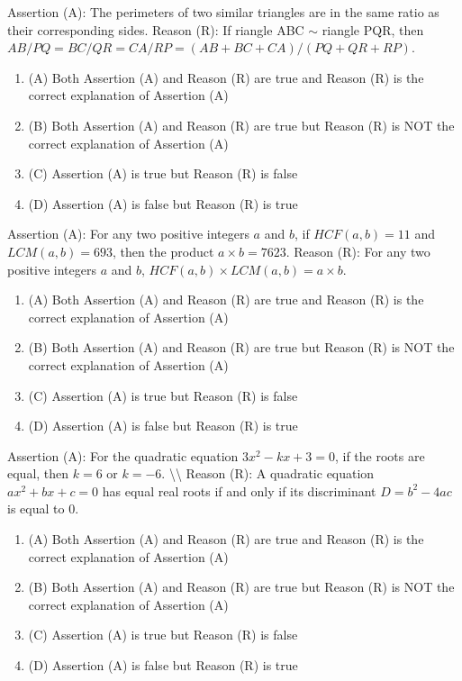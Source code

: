 \documentclass[12pt,a4paper]{exam}
\begin{document}
\begin{questions}
\question[1] Assertion (A): The perimeters of two similar triangles are in the same ratio as their corresponding sides. Reason (R): If 	riangle ABC $\sim$ 	riangle PQR, then $AB/PQ = BC/QR = CA/RP = (AB+BC+CA)/(PQ+QR+RP)$.
\begin{enumerate}[label=(\Alph*)]
  \item (A) Both Assertion (A) and Reason (R) are true and Reason (R) is the correct explanation of Assertion (A)
  \item (B) Both Assertion (A) and Reason (R) are true but Reason (R) is NOT the correct explanation of Assertion (A)
  \item (C) Assertion (A) is true but Reason (R) is false
  \item (D) Assertion (A) is false but Reason (R) is true
\end{enumerate}
\vspace{0.15cm}

\question[1] Assertion (A): For any two positive integers $a$ and $b$, if $HCF(a, b) = 11$ and $LCM(a, b) = 693$, then the product $a \times b = 7623$. Reason (R): For any two positive integers $a$ and $b$, $HCF(a, b) \times LCM(a, b) = a \times b$.
\begin{enumerate}[label=(\Alph*)]
  \item (A) Both Assertion (A) and Reason (R) are true and Reason (R) is the correct explanation of Assertion (A)
  \item (B) Both Assertion (A) and Reason (R) are true but Reason (R) is NOT the correct explanation of Assertion (A)
  \item (C) Assertion (A) is true but Reason (R) is false
  \item (D) Assertion (A) is false but Reason (R) is true
\end{enumerate}
\vspace{0.15cm}

\question[1] Assertion (A): For the quadratic equation $3x^2 - kx + 3 = 0$, if the roots are equal, then $k = 6$ or $k = -6$. \textbackslash{}\textbackslash{} Reason (R): A quadratic equation $ax^2 + bx + c = 0$ has equal real roots if and only if its discriminant $D = b^2 - 4ac$ is equal to $0$.
\begin{enumerate}[label=(\Alph*)]
  \item (A) Both Assertion (A) and Reason (R) are true and Reason (R) is the correct explanation of Assertion (A)
  \item (B) Both Assertion (A) and Reason (R) are true but Reason (R) is NOT the correct explanation of Assertion (A)
  \item (C) Assertion (A) is true but Reason (R) is false
  \item (D) Assertion (A) is false but Reason (R) is true
\end{enumerate}
\vspace{0.15cm}


\end{questions}
\end{document}
